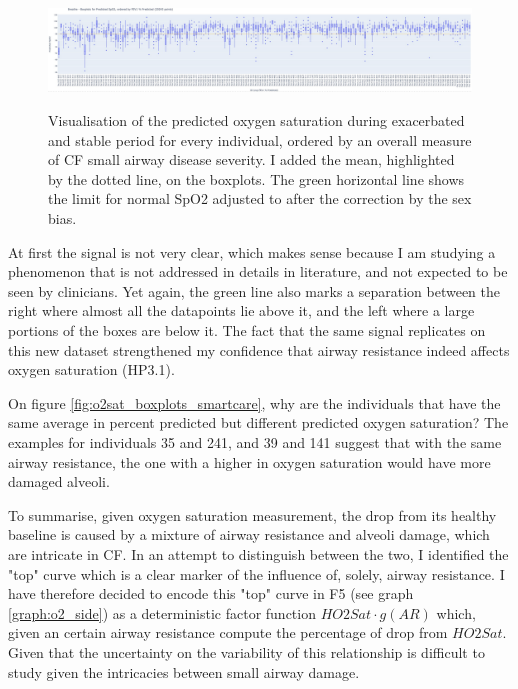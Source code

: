 \begin{figure}[!h]
    \caption{Visualisation of the predicted oxygen saturation during exacerbated and stable period for every individual, ordered by an overall measure of CF small airway disease severity. I added the mean, highlighted by the dotted line, on the boxplots. The green horizontal line shows the limit for normal SpO2 adjusted to after the correction by the sex bias.}
    \centering
    \includegraphics[width=150mm]{Chapter1/Figs/o2sat_boxplots_breathe.png}
    \label{fig:o2sat_boxplots_breathe}
\end{figure}

At first the signal is not very clear, which makes sense because I am studying a phenomenon that is not addressed in details in literature, and not expected to be seen by clinicians. Yet again, the green line also marks a separation between the right where almost all the datapoints lie above it, and the left where a large portions of the boxes are below it. The fact that the same signal replicates on this new dataset strengthened my confidence that airway resistance indeed affects oxygen saturation (HP3.1). 

On figure  \ref{fig:o2sat_boxplots_smartcare}, why are the individuals that have the same average \F in percent predicted but different predicted oxygen saturation? The examples for individuals 35 and 241, and 39 and 141 suggest that with the same airway resistance, the one with a higher in oxygen saturation would have more damaged alveoli. 

To summarise,  given oxygen saturation measurement, the drop from its healthy baseline is caused by a mixture of airway resistance and alveoli damage, which are intricate in CF. In an attempt to distinguish between the two, I identified the "top" curve which is a clear marker of the influence of, solely, airway resistance. I have therefore decided to encode this "top" curve in F5 (see graph \ref{graph:o2_side}) as a deterministic factor function $HO2Sat\cdot g(AR)$ which, given an certain airway resistance compute the percentage of drop from $HO2Sat$. Given that the uncertainty on the variability of this relationship is difficult to study given the intricacies between small airway damage.

